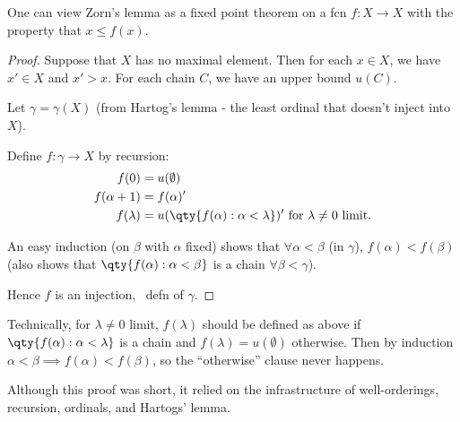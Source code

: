 One can view Zorn's lemma as a fixed point theorem on a fcn $f \colon X \to X$ with the property that $x \leq f(x)$.

\begin{proof}
    Suppose that $X$ has no maximal element.
    Then for each $x \in X$, we have $x' \in X$ and $x' > x$.
    For each chain $C$, we have an upper bound $u(C)$.

    Let $\gamma = \gamma(X)$ (from Hartog's lemma - the least ordinal that doesn't inject into $X$).

    Define $f : \gamma \to X$ by recursion:
    \begin{align*}
        f(0) &= u(\emptyset) \\
        f(\alpha + 1) &= f(\alpha)' \\
        f(\lambda) &= u(\qty{f(\alpha) : \alpha < \lambda})' \text{ for $\lambda \neq 0$ limit}.
    \end{align*}

    An easy induction (on $\beta$ with $\alpha$ fixed) shows that $\forall \alpha < \beta$ (in $\gamma$), $f(\alpha) < f(\beta)$ (also shows that $\qty{f(\alpha) : \alpha < \beta}$ is a chain $\forall \beta < \gamma$).

    Hence $f$ is an injection, \Lightning \ defn of $\gamma$.
\end{proof}

\begin{remark}
    Technically, for $\lambda \neq 0$ limit, $f(\lambda)$ should be defined as above if $\qty{f(\alpha) : \alpha < \lambda}$ is a chain and $f(\lambda) = u(\emptyset)$ otherwise.
    Then by induction $\alpha < \beta \implies f(\alpha) < f(\beta)$, so the ``otherwise'' clause never happens.
\end{remark}

\begin{remark}
    Although this proof was short, it relied on the infrastructure of well-orderings, recursion, ordinals, and Hartogs' lemma.
\end{remark}

